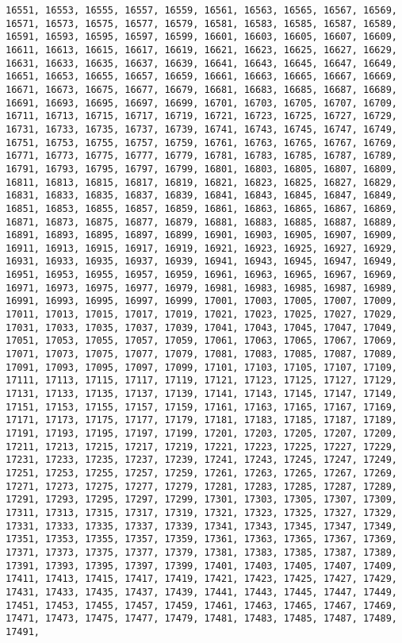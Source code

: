 \documentclass[11pt]{article}
\begin{document}
\begin{Verbatim}[commandchars=\\\{\}]
16551, 16553, 16555, 16557, 16559, 16561, 16563, 16565, 16567, 16569, 16571, 16573, 16575, 16577, 16579, 16581, 16583, 16585, 16587, 16589, 16591, 16593, 16595, 16597, 16599, 16601, 16603, 16605, 16607, 16609, 16611, 16613, 16615, 16617, 16619, 16621, 16623, 16625, 16627, 16629, 16631, 16633, 16635, 16637, 16639, 16641, 16643, 16645, 16647, 16649, 16651, 16653, 16655, 16657, 16659, 16661, 16663, 16665, 16667, 16669, 16671, 16673, 16675, 16677, 16679, 16681, 16683, 16685, 16687, 16689, 16691, 16693, 16695, 16697, 16699, 16701, 16703, 16705, 16707, 16709, 16711, 16713, 16715, 16717, 16719, 16721, 16723, 16725, 16727, 16729, 16731, 16733, 16735, 16737, 16739, 16741, 16743, 16745, 16747, 16749, 16751, 16753, 16755, 16757, 16759, 16761, 16763, 16765, 16767, 16769, 16771, 16773, 16775, 16777, 16779, 16781, 16783, 16785, 16787, 16789, 16791, 16793, 16795, 16797, 16799, 16801, 16803, 16805, 16807, 16809, 16811, 16813, 16815, 16817, 16819, 16821, 16823, 16825, 16827, 16829, 16831, 16833, 16835, 16837, 16839, 16841, 16843, 16845, 16847, 16849, 16851, 16853, 16855, 16857, 16859, 16861, 16863, 16865, 16867, 16869, 16871, 16873, 16875, 16877, 16879, 16881, 16883, 16885, 16887, 16889, 16891, 16893, 16895, 16897, 16899, 16901, 16903, 16905, 16907, 16909, 16911, 16913, 16915, 16917, 16919, 16921, 16923, 16925, 16927, 16929, 16931, 16933, 16935, 16937, 16939, 16941, 16943, 16945, 16947, 16949, 16951, 16953, 16955, 16957, 16959, 16961, 16963, 16965, 16967, 16969, 16971, 16973, 16975, 16977, 16979, 16981, 16983, 16985, 16987, 16989, 16991, 16993, 16995, 16997, 16999, 17001, 17003, 17005, 17007, 17009, 17011, 17013, 17015, 17017, 17019, 17021, 17023, 17025, 17027, 17029, 17031, 17033, 17035, 17037, 17039, 17041, 17043, 17045, 17047, 17049, 17051, 17053, 17055, 17057, 17059, 17061, 17063, 17065, 17067, 17069, 17071, 17073, 17075, 17077, 17079, 17081, 17083, 17085, 17087, 17089, 17091, 17093, 17095, 17097, 17099, 17101, 17103, 17105, 17107, 17109, 17111, 17113, 17115, 17117, 17119, 17121, 17123, 17125, 17127, 17129, 17131, 17133, 17135, 17137, 17139, 17141, 17143, 17145, 17147, 17149, 17151, 17153, 17155, 17157, 17159, 17161, 17163, 17165, 17167, 17169, 17171, 17173, 17175, 17177, 17179, 17181, 17183, 17185, 17187, 17189, 17191, 17193, 17195, 17197, 17199, 17201, 17203, 17205, 17207, 17209, 17211, 17213, 17215, 17217, 17219, 17221, 17223, 17225, 17227, 17229, 17231, 17233, 17235, 17237, 17239, 17241, 17243, 17245, 17247, 17249, 17251, 17253, 17255, 17257, 17259, 17261, 17263, 17265, 17267, 17269, 17271, 17273, 17275, 17277, 17279, 17281, 17283, 17285, 17287, 17289, 17291, 17293, 17295, 17297, 17299, 17301, 17303, 17305, 17307, 17309, 17311, 17313, 17315, 17317, 17319, 17321, 17323, 17325, 17327, 17329, 17331, 17333, 17335, 17337, 17339, 17341, 17343, 17345, 17347, 17349, 17351, 17353, 17355, 17357, 17359, 17361, 17363, 17365, 17367, 17369, 17371, 17373, 17375, 17377, 17379, 17381, 17383, 17385, 17387, 17389, 17391, 17393, 17395, 17397, 17399, 17401, 17403, 17405, 17407, 17409, 17411, 17413, 17415, 17417, 17419, 17421, 17423, 17425, 17427, 17429, 17431, 17433, 17435, 17437, 17439, 17441, 17443, 17445, 17447, 17449, 17451, 17453, 17455, 17457, 17459, 17461, 17463, 17465, 17467, 17469, 17471, 17473, 17475, 17477, 17479, 17481, 17483, 17485, 17487, 17489, 17491, 
\end{Verbatim}
\end{document}

